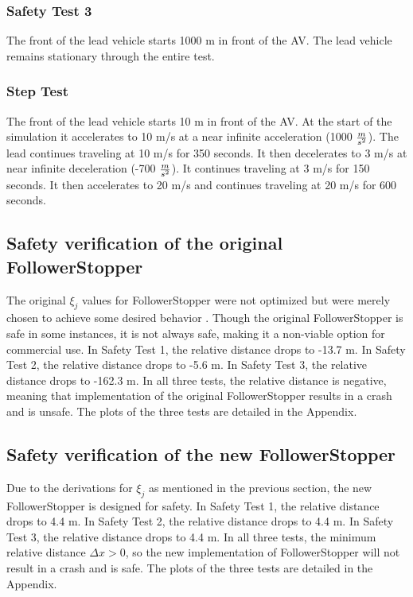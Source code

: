 \documentclass[conference]{IEEEtran}
\begin{document}
\subsubsection{Safety Test 3}
The front of the lead vehicle starts 1000 m in front of the AV. The lead vehicle remains stationary through the entire test.
\subsubsection{Step Test}
The front of the lead vehicle starts 10 m in front of the AV. At the start of the simulation it accelerates to 10 m/s at a near infinite acceleration (1000 $m\over s^2$). The lead continues traveling at 10 m/s for 350 seconds. It then decelerates to 3 m/s at near infinite deceleration (-700 $m\over s^2$). It continues traveling at 3 m/s for 150 seconds. It then accelerates to 20 m/s and continues traveling at 20 m/s for 600 seconds.

\subsection{Safety verification of the original FollowerStopper}
The original $\xi_j$ values for FollowerStopper were not optimized but were merely chosen to achieve some desired behavior \cite{bhadani2019real}. Though the original FollowerStopper is safe in some instances, it is not always safe, making it a non-viable option for commercial use. In Safety Test 1, the relative distance drops to -13.7 m. In Safety Test 2, the relative distance drops to -5.6 m. In Safety Test 3, the relative distance drops to -162.3 m. In all three tests, the relative distance is negative, meaning that implementation of the original FollowerStopper results in a crash and is unsafe. The plots of the three tests are detailed in the Appendix.

\subsection{Safety verification of the new FollowerStopper}
Due to the derivations for $\xi_j$ as mentioned in the previous section, the new FollowerStopper is designed for safety. In Safety Test 1, the relative distance drops to 4.4 m. In Safety Test 2, the relative distance drops to 4.4 m. In Safety Test 3, the relative distance drops to 4.4 m. In all three tests, the minimum relative distance $\Delta x>0$, so the new implementation of FollowerStopper will not result in a crash and is safe. The plots of the three tests are detailed in the Appendix.
\end{document}
